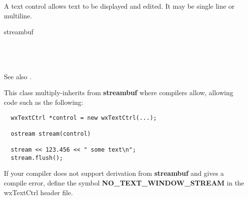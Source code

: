 \section{}\label{wxtextctrl}

A text control allows text to be displayed and edited. It may be
single line or multiline.


streambuf\\
\\
\\
\\


\twocolwidtha{5cm}
\begin{twocollist}\itemsep=0pt
\end{twocollist}

See also .


This class multiply-inherits from {\bf streambuf} where compilers allow, allowing code such
as the following:

{\small%
\begin{verbatim}
  wxTextCtrl *control = new wxTextCtrl(...);

  ostream stream(control)

  stream << 123.456 << " some text\n";
  stream.flush();
\end{verbatim}
}%

If your compiler does not support derivation from {\bf streambuf} and gives a compile error, define the symbol {\bf NO\_TEXT\_WINDOW\_STREAM} in the
wxTextCtrl header file.

%
%

